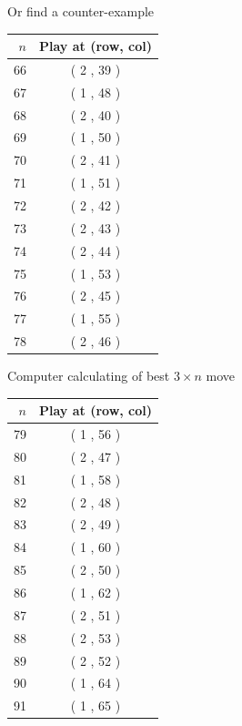 \documentclass{beamer}
\begin{document}
\begin{frame}{Or find a counter-example}
\begin{center}
\begin{tabular}{r|c}
\hline
$n$ & Play at (row, col) \\
\hline
66  & ( 2 , 39 ) \\
67  & ( 1 , 48 ) \\
68  & ( 2 , 40 ) \\
69  & ( 1 , 50 ) \\
70  & ( 2 , 41 ) \\
71  & ( 1 , 51 ) \\
72  & ( 2 , 42 ) \\
73  & ( 2 , 43 ) \\
74  & ( 2 , 44 ) \\
75  & ( 1 , 53 ) \\
76  & ( 2 , 45 ) \\
77  & ( 1 , 55 ) \\
78  & ( 2 , 46 ) \\
\end{tabular}
\end{center}
\end{frame}
\begin{frame}{Computer calculating of best $3\times n$ move}
\begin{center}
\begin{tabular}{r|c}
\hline
$n$ & Play at (row, col) \\
\hline
79  & ( 1 , 56 ) \\
80  & ( 2 , 47 ) \\
81  & ( 1 , 58 ) \\
82  & ( 2 , 48 ) \\
83  & ( 2 , 49 ) \\
84  & ( 1 , 60 ) \\
85  & ( 2 , 50 ) \\
86  & ( 1 , 62 ) \\
87  & ( 2 , 51 ) \\
88  & ( 2 , 53 ) \\
89  & ( 2 , 52 ) \\
90  & ( 1 , 64 ) \\
91  & ( 1 , 65 ) \\
\end{tabular}
\end{center}
\end{frame}
\end{document}
